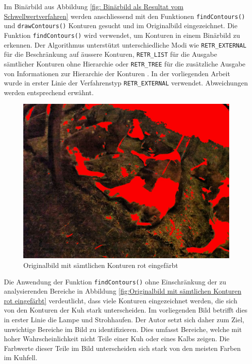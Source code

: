 Im Binärbild aus Abbildung \ref{fig: Binärbild als Resultat vom Schwellwertverfahren} werden anschliessend mit den Funktionen \texttt{findContours()} und \texttt{drawContours()} Konturen gesucht und im Originalbild eingezeichnet. Die Funktion \texttt{findContours()} wird verwendet, um Konturen in einem Binärbild zu erkennen. Der Algorithmus unterstützt unterschiedliche Modi wie \texttt{RETR_EXTERNAL} für die Beschränkung auf äussere Konturen, \texttt{RETR_LIST} für die Ausgabe sämtlicher Konturen ohne Hierarchie oder \texttt{RETR_TREE} für die zusätzliche Ausgabe von Informationen zur Hierarchie der Konturen \cite[S.366]{FernandezVillan2019}. In der vorliegenden Arbeit wurde in erster Linie der Verfahrenstyp \texttt{RETR_EXTERNAL} verwendet. Abweichungen werden entsprechend erwähnt.

\begin{figure}[H]
	\center
	\includegraphics[scale=0.43]{Grafiken/entwicklung/8thresholdedImageAllContours.jpg}
	\caption{Originalbild mit sämtlichen Konturen rot eingefärbt} 
	\label{fig:Originalbild mit sämtlichen Konturen rot eingefärbt } 
\end{figure}

Die Anwendung der Funktion \texttt{findContours()} ohne Einschränkung der zu analysierenden Bereiche in Abbildung \ref{fig:Originalbild mit sämtlichen Konturen rot eingefärbt} verdeutlicht, dass viele Konturen eingezeichnet werden, die sich von den Konturen der Kuh stark unterscheiden. Im vorliegenden Bild betrifft dies in erster Linie die Lampe und Strohhaufen. Der Autor setzt sich daher zum Ziel, unwichtige Bereiche im Bild zu identifizieren. Dies umfasst Bereiche, welche mit hoher Wahrscheinlichkeit nicht Teile einer Kuh oder eines Kalbs zeigen. Die Farbwerte dieser Teile im Bild
unterscheiden sich stark von den meisten Farben im Kuhfell. 

